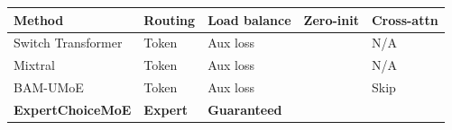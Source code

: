 \begin{table}[H]
\centering
\small
\begin{tabular}{lllll}
\toprule
\textbf{Method} & \textbf{Routing} & \textbf{Load balance} & \textbf{Zero-init} & \textbf{Cross-attn} \\
\midrule
Switch Transformer & Token & Aux loss &  & N/A \\
Mixtral & Token & Aux loss &  & N/A \\
BAM-UMoE & Token & Aux loss &  & Skip \\
\textbf{ExpertChoiceMoE} & \textbf{Expert} & \textbf{Guaranteed} &  &  \\
\bottomrule
\end{tabular}
\end{table}

